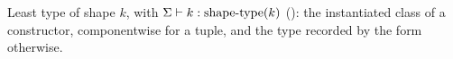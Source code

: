 Least type of shape $k$, with $\Sigma \vdash k : \mathrm{shape\text{-}type}(k)$ (): the instantiated class of a
constructor, componentwise for a tuple, and the type recorded by the form otherwise.
